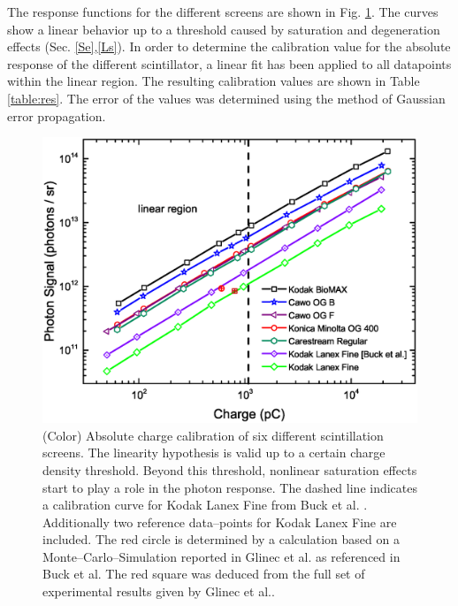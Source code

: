 \documentclass[%
reprint,
amsmath,
amssymb,
aip,
rsi, 
numerical,
floatfix,
]{revtex4-1}
\begin{document}


The response functions for the different screens are shown in Fig. \ref{fig:Calib}.
The curves show a linear behavior up to a threshold caused by saturation and degeneration effects (Sec. \ref{Se},\ref{Ls}).  
In order to determine the calibration value for the absolute response of the different scintillator, a linear fit has been applied to all datapoints within the linear region.
The resulting calibration values are shown in Table \ref{table:res}. 
The error of the values was determined using the method of Gaussian error propagation.
   
\begin{figure}
\includegraphics[width=\textwidth]{./Figures/Absolute}%
\caption{\label{fig:Calib}(Color) Absolute charge calibration of six different scintillation screens.
The linearity hypothesis is valid up to a certain charge density threshold. 
Beyond this threshold, nonlinear saturation effects start to play a role in the photon response.
The dashed line indicates a calibration curve for Kodak Lanex Fine from Buck et al.\cite{Buck2010} .
Additionally two reference data--points for Kodak Lanex Fine are included. 
The red circle is determined by a calculation based on a Monte--Carlo--Simulation reported in Glinec et al.\cite{Glinec2006} as referenced in Buck et al. 
The red square was deduced from the full set of experimental results given by Glinec et al.. }
\end{figure}
\end{document}
